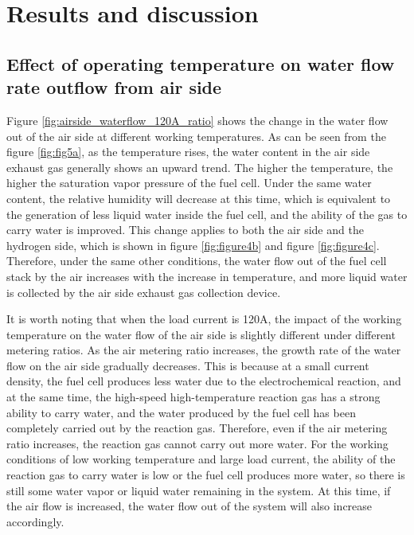 \section{Results and discussion}
\subsection{Effect of operating temperature on water flow rate outflow from air side}

Figure \ref{fig:airside_waterflow_120A_ratio} shows the change in the water flow out of the air side at different working temperatures. As can be seen from the figure \ref{fig:fig5a}, as the temperature rises, the water content in the air side exhaust gas generally shows an upward trend. The higher the temperature, the higher the saturation vapor pressure of the fuel cell. Under the same water content, the relative humidity will decrease at this time, which is equivalent to the generation of less liquid water inside the fuel cell, and the ability of the gas to carry water is improved. This change applies to both the air side and the hydrogen side, which is shown in figure \ref{fig:figure4b} and figure \ref{fig:figure4c}. Therefore, under the same other conditions, the water flow out of the fuel cell stack by the air increases with the increase in temperature, and more liquid water is collected by the air side exhaust gas collection device.
\par
It is worth noting that when the load current is 120A, the impact of the working temperature on the water flow of the air side is slightly different under different metering ratios. As the air metering ratio increases, the growth rate of the water flow on the air side gradually decreases. This is because at a small current density, the fuel cell produces less water due to the electrochemical reaction, and at the same time, the high-speed high-temperature reaction gas has a strong ability to carry water, and the water produced by the fuel cell has been completely carried out by the reaction gas. Therefore, even if the air metering ratio increases, the reaction gas cannot carry out more water. For the working conditions of low working temperature and large load current, the ability of the reaction gas to carry water is low or the fuel cell produces more water, so there is still some water vapor or liquid water remaining in the system. At this time, if the air flow is increased, the water flow out of the system will also increase accordingly.
